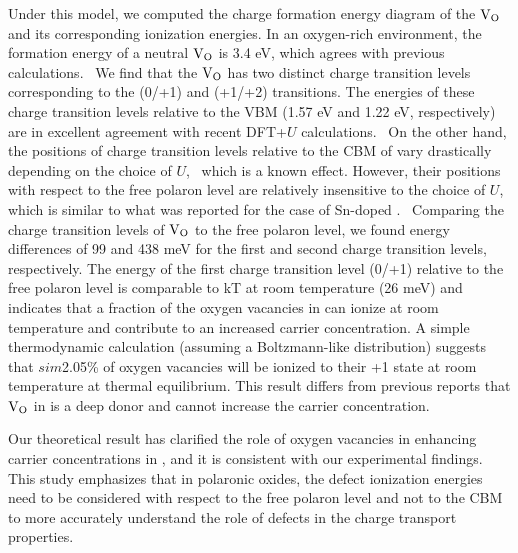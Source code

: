 Under this model, we computed the charge formation energy diagram of the $\rm V_O$ and its corresponding ionization energies. In an oxygen-rich environment, the formation energy of a neutral $\rm V_O$ is 3.4 eV, which agrees with previous calculations.~\cite{paudel2012intrinsic,kay2006new,zhang2010density,shimada2016multiferroic} We find that the $\rm V_O$ has two distinct charge transition levels corresponding to the (0/+1) and (+1/+2) transitions. The energies of these charge transition levels relative to the VBM (1.57 eV and 1.22 eV, respectively) are in excellent agreement with recent DFT+$U$ calculations.~\cite{geneste2019polarons} On the other hand, the positions of charge transition levels relative to the CBM of  vary drastically depending on the choice of $U$,~\cite{paudel2012intrinsic,geneste2019polarons,zhang2010density} which is a known effect. However, their positions with respect to the free polaron level are relatively insensitive to the choice of $U$, which is similar to what was reported for the case of Sn-doped .~\cite{smart2017effect} Comparing the charge transition levels of $\rm V_O$ to the free polaron level, we found energy differences of 99 and 438 meV for the first and second charge transition levels, respectively. The energy of the first charge transition level (0/+1) relative to the free polaron level is comparable to kT at room temperature (26 meV) and indicates that a fraction of the oxygen vacancies in  can ionize at room temperature and contribute to an increased carrier concentration. A simple thermodynamic calculation (assuming a Boltzmann-like distribution) suggests that $sim$2.05\% of oxygen vacancies will be ionized to their +1 state at room temperature at thermal equilibrium. This result differs from previous reports that $\rm V_O$ in  is a deep donor and cannot increase the carrier concentration.~\cite{paudel2012intrinsic,kay2006new,zhang2010density,shimada2016multiferroic}

Our theoretical result has clarified the role of oxygen vacancies in enhancing carrier concentrations in , and it is consistent with our experimental findings. This study emphasizes that in polaronic oxides, the defect ionization energies need to be considered with respect to the free polaron level and not to the CBM to more accurately understand the role of defects in the charge transport properties.



